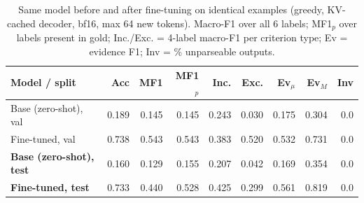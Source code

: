 \begin{table}[t]
\centering
\footnotesize
\caption{Same model before and after fine-tuning on identical examples (greedy, KV-cached decoder, bf16, max 64 new tokens). Macro-F1 over all 6 labels; MF1$_p$ over labels present in gold; Inc./Exc. = 4-label macro-F1 per criterion type; Ev = evidence F1; Inv = \% unparseable outputs.}
\label{tab:main}
\begin{tabular}{lrrrrrrrr}
\toprule
Model / split & Acc & MF1 & MF1$_p$ & Inc. & Exc. & Ev$_\mu$ & Ev$_M$ & Inv \\
\midrule
Base (zero-shot), val & 0.189 & 0.145 & 0.145 & 0.243 & 0.030 & 0.175 & 0.304 & 0.0 \\
Fine-tuned, val & 0.738 & 0.543 & 0.543 & 0.383 & 0.520 & 0.532 & 0.731 & 0.0 \\
\textbf{Base (zero-shot), test} & 0.160 & 0.129 & 0.155 & 0.207 & 0.042 & 0.169 & 0.354 & 0.0 \\
\textbf{Fine-tuned, test} & 0.733 & 0.440 & 0.528 & 0.425 & 0.299 & 0.561 & 0.819 & 0.0 \\
\bottomrule
\end{tabular}
\end{table}
